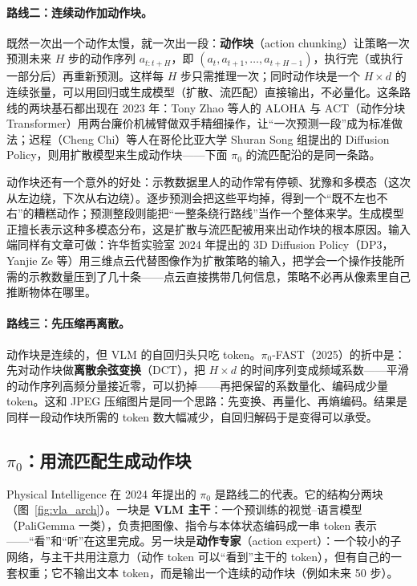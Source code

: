 \paragraph{路线二：连续动作加动作块。}
既然一次出一个动作太慢，就一次出一段：\textbf{动作块}（action chunking）让策略一次预测未来 $H$ 步的动作序列 $a_{t:t+H}$，即 $(a_t, a_{t+1}, \ldots, a_{t+H-1})$，执行完（或执行一部分后）再重新预测。这样每 $H$ 步只需推理一次；同时动作块是一个 $H \times d$ 的连续张量，可以用回归或生成模型（扩散、流匹配）直接输出，不必量化。这条路线的两块基石都出现在 2023 年：Tony Zhao 等人的 ALOHA 与 ACT（动作分块 Transformer）用两台廉价机械臂做双手精细操作，让“一次预测一段”成为标准做法；迟程（Cheng Chi）等人在哥伦比亚大学 Shuran Song 组提出的 Diffusion Policy，则用扩散模型来生成动作块——下面 $\pi_0$ 的流匹配沿的是同一条路。

动作块还有一个意外的好处：示教数据里人的动作常有停顿、犹豫和多模态（这次从左边绕，下次从右边绕）。逐步预测会把这些平均掉，得到一个“既不左也不右”的糟糕动作；预测整段则能把“一整条绕行路线”当作一个整体来学。生成模型正擅长表示这种多模态分布，这是扩散与流匹配被用来出动作块的根本原因。输入端同样有文章可做：许华哲实验室 2024 年提出的 3D Diffusion Policy（DP3，Yanjie Ze 等）用三维点云代替图像作为扩散策略的输入，把学会一个操作技能所需的示教数量压到了几十条——点云直接携带几何信息，策略不必再从像素里自己推断物体在哪里。

\paragraph{路线三：先压缩再离散。}
动作块是连续的，但 VLM 的自回归头只吃 token。$\pi_0$-FAST（2025）的折中是：先对动作块做\textbf{离散余弦变换}（DCT），把 $H \times d$ 的时间序列变成频域系数——平滑的动作序列高频分量接近零，可以扔掉——再把保留的系数量化、编码成少量 token。这和 JPEG 压缩图片是同一个思路：先变换、再量化、再熵编码。结果是同样一段动作块所需的 token 数大幅减少，自回归解码于是变得可以承受。

\subsection{$\pi_0$：用流匹配生成动作块}

Physical Intelligence 在 2024 年提出的 $\pi_0$ 是路线二的代表。它的结构分两块（图~\ref{fig:vla_arch}）。一块是 \textbf{VLM 主干}：一个预训练的视觉--语言模型（PaliGemma 一类），负责把图像、指令与本体状态编码成一串 token 表示——“看”和“听”在这里完成。另一块是\textbf{动作专家}（action expert）：一个较小的子网络，与主干共用注意力（动作 token 可以“看到”主干的 token），但有自己的一套权重；它不输出文本 token，而是输出一个连续的动作块（例如未来 50 步）。


